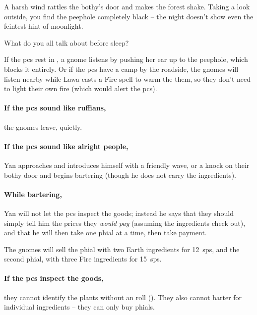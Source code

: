 \begin{boxtext}
	A harsh wind rattles the \gls{bothy}'s door and makes the forest shake.
	Taking a look outside, you find the peephole completely black -- the night doesn't show even the feintest hint of moonlight.

	What do you all talk about before sleep?
\end{boxtext}

If the \glspl{pc} rest in , a gnome listens by pushing her ear up to the peephole, which blocks it entirely.
Or if the \glspl{pc} have a camp by the roadside, the gnomes will listen nearby while Lawa casts a Fire spell to warm the them, so they don't need to light their own fire (which would alert the \glspl{pc}).

\paragraph{If the \glspl{pc} sound like ruffians,}
the gnomes leave, quietly.

\paragraph{If the \glspl{pc} sound like alright people,}
Yan approaches and introduces himself with a friendly wave, or a knock on their \gls{bothy} door and begins bartering (though he does not carry the \glspl{ingredient}).

\paragraph{While bartering,}
Yan will not let the \glspl{pc} inspect the goods; instead he says that they should simply tell him the prices they \textit{would pay} (assuming the \glspl{ingredient} check out), and that he will then take one phial at a time, then take payment.

The gnomes will sell the phial with two Earth \glspl{ingredient} for 12~\glspl{sp}, and the second phial, with three Fire \glspl{ingredient} for 15~\glspl{sp}.

\paragraph{If the \glspl{pc} inspect the goods,}
they cannot identify the plants without an  roll (\tn[12]).
They also cannot barter for individual \glspl{ingredient} -- they can only buy phials.

